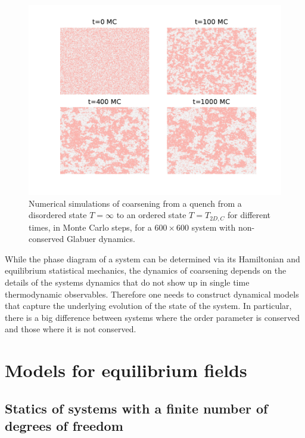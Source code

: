 \begin{figure}[t]
    \centering
    \includegraphics[width=\linewidth]{intro/clusterization.pdf}
    \caption{Numerical simulations of coarsening from a quench from a disordered state $T=\infty$ to an ordered state  $T=T_{2D,C}$ \cite{onsager_crystal_1944} for different times, in Monte Carlo steps, for a $600 \times 600$ system with non-conserved Glabuer dynamics.}
    \label{clusterization}
\end{figure}

While the phase diagram of a system can be determined via its Hamiltonian and equilibrium statistical mechanics, the dynamics of coarsening depends on {\color{red} the} details of the systems dynamics that do not show up in single time thermodynamic observables. Therefore one needs to construct dynamical models that capture the underlying evolution of the state of the system. In particular, there is a big difference between systems where the order parameter is conserved and those where it is not conserved.

    \section{Models for equilibrium fields}

    \subsection{Statics of systems with a finite number of degrees of freedom}


